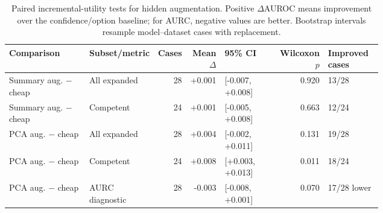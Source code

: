 
\begin{table}[t]
\centering
\caption{Paired incremental-utility tests for hidden augmentation. Positive $\Delta$AUROC means improvement over the confidence/option baseline; for AURC, negative values are better. Bootstrap intervals resample model--dataset cases with replacement.}
\label{tab:paired-tests}
\footnotesize
\begin{tabularx}{\linewidth}{p{0.23\linewidth}p{0.18\linewidth}r r p{0.16\linewidth}r p{0.15\linewidth}}
\toprule
Comparison & Subset/metric & Cases & Mean $\Delta$ & 95\% CI & Wilcoxon $p$ & Improved cases\\
\midrule
Summary aug. $-$ cheap & All expanded & 28 & +0.001 & [-0.007, +0.008] & 0.920 & 13/28\\
Summary aug. $-$ cheap & Competent & 24 & +0.001 & [-0.005, +0.008] & 0.663 & 12/24\\
PCA aug. $-$ cheap & All expanded & 28 & +0.004 & [-0.002, +0.011] & 0.131 & 19/28\\
PCA aug. $-$ cheap & Competent & 24 & +0.008 & [+0.003, +0.013] & 0.011 & 18/24\\
PCA aug. $-$ cheap & AURC diagnostic & 28 & -0.003 & [-0.008, +0.001] & 0.070 & 17/28 lower\\
\bottomrule
\end{tabularx}
\end{table}
